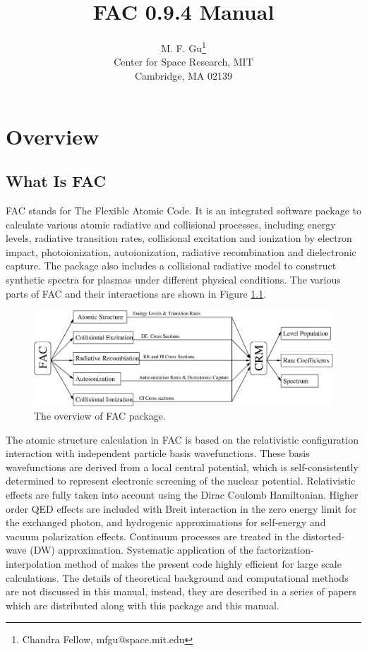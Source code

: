 \documentclass[twoside,letterpaper]{refrep}
\newcommand{\facversion}{{0.9.4}\xspace}
\begin{document}
\title{FAC \facversion Manual}
\author{M. F. Gu\thanks{Chandra Fellow,  mfgu@space.mit.edu} \\
Center for Space Research, MIT \\ Cambridge, MA 02139}

\date{}

\maketitle

\tableofcontents

\chapter{Overview}
\label{cha:overview}

\section{What Is FAC}
FAC stands for The Flexible Atomic Code. It is an
integrated software package to calculate various atomic radiative and
collisional processes, including energy levels, radiative transition rates,
collisional excitation and 
ionization by electron impact, photoionization, autoionization, radiative
recombination and dielectronic capture. The package also includes a
collisional radiative model to construct synthetic spectra for plasmas under
different physical conditions. The various parts of FAC and their
interactions are shown in Figure \ref{fig:flow}. 

\begin{figure}
\includegraphics[width=6in]{flow.eps}
\caption{\label{fig:flow}The overview of FAC package.}
\end{figure}

The atomic structure calculation in FAC is based on the relativistic
configuration interaction with independent particle basis wavefunctions. These
basis wavefunctions are derived from a local central potential, which is
self-consistently determined to represent electronic screening of the nuclear
potential. Relativistic effects are fully taken into account using the Dirac
Coulomb Hamiltonian. Higher order QED effects are included with Breit
interaction in the zero energy limit for the exchanged photon, and hydrogenic
approximations for self-energy and vacuum polarization effects. 
Continuum processes are treated
in the distorted-wave (DW) approximation. Systematic application of the
factorization-interpolation method of \citet{barshalom88} makes the present
code highly efficient for large scale calculations. The details of theoretical
background and computational methods are not discussed in this manual,
instead, they are described in a series of papers which are distributed along
with this package and this manual.
\end{document}
